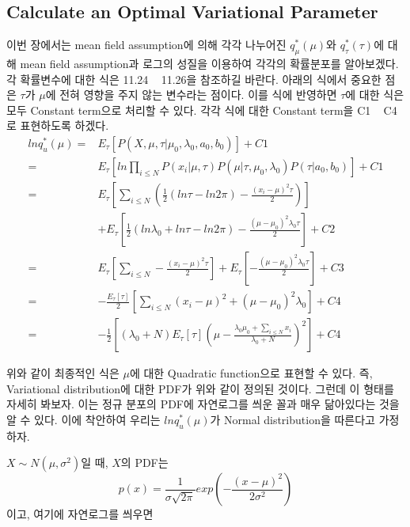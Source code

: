 \documentclass[draft=false]{oblivoir}
\begin{document}
\subsection{Calculate an Optimal Variational Parameter}
이번 장에서는 mean field assumption에 의해 각각 나누어진 $q_{\mu}^{*}(\mu)$와 $q_{\tau}^{*}(\tau)$에 대해 mean field assumption과 로그의 성질을 이용하여 각각의 확률분포를 알아보겠다. 각 확률변수에 대한 식은 11.24 ~ 11.26을 참조하길 바란다. 아래의 식에서 중요한 점은 $\tau$가 $\mu$에 전혀 영향을 주지 않는 변수라는 점이다. 이를 식에 반영하면 $\tau$에 대한 식은 모두 Constant term으로 처리할 수 있다. 각각 식에 대한 Constant term을 C1 ~ C4로 표현하도록 하겠다.  \\
\begin{align}
lnq_{u}^*(\mu)\nonumber = {} & E_{\tau}\left[ P(X,\mu,\tau|\mu_{0},\lambda_{0},a_{0},b_{0}) \right] +C1\nonumber\\
= {} &	E_{\tau} \left[ln\prod_{i\leq N}{P(x_{i}|\mu, \tau) P(\mu|\tau,\mu_{0},\lambda_{0})P(\tau|a_{0},b_{0})} \right] + C1\nonumber\\
= {} & E_{\tau}\left[ \sum_{i \leq N}\left( \frac{1}{2}(ln \tau -ln2 \pi) - \frac{(x_{i}-\mu)^{2}\tau}{2} \right) \right]\nonumber\\
& + E_{\tau}\left[ \frac{1}{2}(ln \lambda_{0} + ln \tau-ln2 \pi ) - \frac{(\mu -\mu_{0})^{2} \lambda_{0} \tau}{2}\right] + C2\nonumber\\
= {} & E_{\tau}\left[ \sum_{i \leq N} - \frac{(x_{i}-\mu)^{2}\tau}{2} \right] + E_{\tau}\left[ - \frac{(\mu -\mu_{0})^{2} \lambda_{0} \tau}{2}\right] + C3\nonumber\\
= {} & -\frac{E_{\tau}[\tau]}{2}\left[ \sum_{i \leq N} (x_{i}-\mu)^{2} + (\mu -\mu_{0})^{2} \lambda_{0}\right] + C4 \nonumber\\
= {} & -\frac{1}{2}\left[(\lambda_{0} +N)E_{\tau}[\tau] \left(\mu - \frac{\lambda_{0}\mu_{0}+\sum_{i \leq N}x_{i}}{\lambda_{0}+N}   \right)^{2}\right] +C4
\label{eq:11-2-8}
\end{align}

위와 같이 최종적인 식은 $\mu$에 대한 Quadratic function으로 표현할 수 있다. 즉, Variational distribution에 대한 PDF가 위와 같이 정의된 것이다. 그런데 이 형태를 자세히 봐보자. 이는 정규 분포의 PDF에 자연로그를 씌운 꼴과 매우 닮아있다는 것을 알 수 있다. 이에 착안하여 우리는 $ln q_{u}^*(\mu)$가 Normal distribution을 따른다고 가정하자.


$X \sim N(\mu, \sigma^2)$일 때, $X$의 PDF는 
\begin{equation}
p(x) = \frac{1}{\sigma \sqrt{2\pi}}exp\left( -\frac{(x-\mu)^{2}}{2\sigma^{2}} \right)
\label{eq:11-2-9}
\end{equation}
이고, 여기에 자연로그를 씌우면
\end{document}
